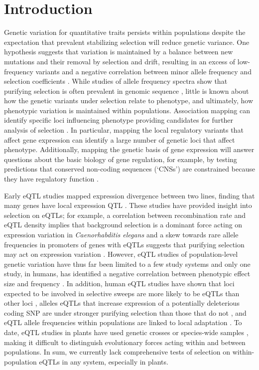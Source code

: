 \section{Introduction}
Genetic variation for quantitative traits persists within populations despite the expectation that prevalent stabilizing selection will reduce genetic variance. One hypothesis suggests that variation is maintained by a balance between new mutations and their removal by selection and drift, resulting in an excess of low-frequency variants and a negative correlation between minor allele frequency and selection coefficients \citep{Haldane1927-pj}. While studies of allele frequency spectra show that purifying selection is often prevalent in genomic sequence \citep{Kousathanas2011-bf,Zhu2011-gf,Williamson2014-tf}, little is known about how the genetic variants under selection relate to phenotype, and ultimately, how phenotypic variation is maintained within populations. Association mapping can identify specific loci influencing phenotype providing candidates for further analysis of selection \citep{Lee2014-pi}. In particular, mapping the local regulatory variants that affect gene expression can identify a large number of genetic loci that affect phenotype. Additionally, mapping the genetic basis of gene expression will answer questions about the basic biology of gene regulation, for example, by testing predictions that conserved non-coding sequences (‘CNSs’) are constrained because they have regulatory function \citep{Haudry2013-qe}.

Early eQTL studies mapped expression divergence between two lines, finding that many genes have local expression QTL \citep{Brem2005-gs,Brem2002-cc}. These studies have provided insight into selection on eQTLs; for example,  a correlation between recombination rate and eQTL density implies that background selection is a dominant force acting on expression variation in \textit{Caenorhabditis elegans} \citep{Rockman2010-qm} and a skew towards rare allele frequencies in promoters of genes with eQTLs suggests that purifying selection may act on expression variation \citep{Ronald2007-hf}. However, eQTL studies of population-level genetic variation have thus far been limited to a few study systems \citep{Massouras2012-wq,Pickrell2010-ci,Lappalainen2013-jh,Battle2014-ke,Tung2015-cg} and only one study, in humans, has identified a negative correlation between phenotypic effect size and frequency \citep{Battle2014-ke}. In addition, human eQTL studies have shown that loci expected to be involved in selective sweeps are more likely to be eQTLs than other loci \citep{Kudaravalli2009-gw}, alleles eQTLs that increase expression of a potentially deleterious coding SNP are under stronger purifying selection than those that do not \citep{Lappalainen2011-tw}, and eQTL allele frequencies within populations are linked to local adaptation \citep{Fraser2013-rm,Ye2013-fx}. To date, eQTL studies in plants have used genetic crosses \citep{Potokina2008-bk,West2007-fm,Bolon2014-km} or species-wide samples \citep{Gan2011-xv, Zhang2011-ut,Fu2013-kf}, making it difficult to distinguish evolutionary forces acting within and between populations. In sum, we currently lack comprehensive tests of selection on within-population eQTLs in any system, especially in plants.

